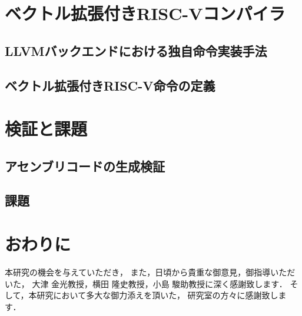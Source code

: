 \documentclass[a4paper,11pt,fleqn]{jbook}
\begin{document}
\newpage
\chapter{ベクトル拡張付きRISC-Vコンパイラ}
\label{chp:4}

\section{LLVMバックエンドにおける独自命令実装手法}
\label{chp:4_1}

\section{ベクトル拡張付きRISC-V命令の定義}
\label{chp:4_2}


\newpage
\chapter{検証と課題}
\label{chp:5}

\section{アセンブリコードの生成検証}
\label{chp:5_1}

\section{課題}
\label{chp:5_2}


\newpage
\chapter{おわりに}
\label{chp:outro}


\newpage
\acknowledgement
本研究の機会を与えていただき，
また，日頃から貴重な御意見，御指導いただいた，
大津 金光教授，横田 隆史教授，小島 駿助教授に深く感謝致します．
そして，本研究において多大な御力添えを頂いた，
研究室の方々に感謝致します．


\endacknowledgement

\newpage
{}

\endthebibliography
\end{document}
